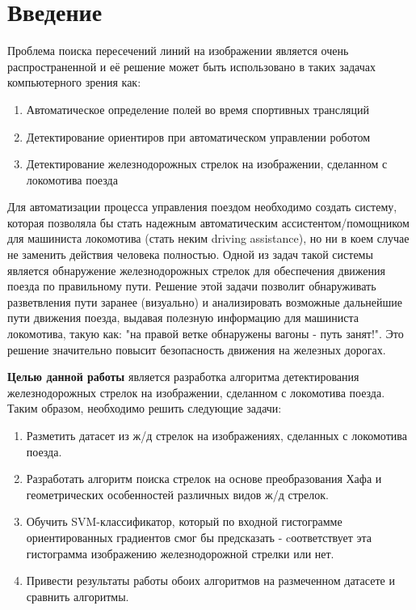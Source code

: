 \chapter{Введение}
\justify
Проблема поиска пересечений линий на изображении является очень распространенной и её решение может быть использовано в таких задачах компьютерного зрения как:
\begin{enumerate}
	\item Автоматическое определение полей во время спортивных трансляций
	\item Детектирование ориентиров при автоматическом управлении роботом
	\item Детектирование железнодорожных стрелок на изображении, сделанном с локомотива поезда
\end{enumerate} 

Для автоматизации процесса управления поездом необходимо создать систему, которая позволяла бы стать надежным автоматическим ассистентом/помощником для машиниста локомотива (стать неким driving assistance), но ни в коем случае не заменить действия человека полностью. 
Одной из задач такой системы является обнаружение железнодорожных стрелок для обеспечения движения поезда по правильному пути.
Решение этой задачи позволит обнаруживать разветвления пути заранее (визуально) и анализировать возможные дальнейшие пути движения поезда, выдавая полезную информацию для машиниста локомотива, такую как: "на правой ветке обнаружены вагоны - путь занят!". Это решение значительно повысит безопасность движения на железных дорогах.

\textbf{Целью данной работы} является разработка алгоритма детектирования железнодорожных стрелок на изображении, сделанном с локомотива поезда. Таким образом, необходимо решить следующие задачи:
\begin{enumerate}
	\item Разметить датасет из ж/д стрелок на изображениях, сделанных с локомотива поезда.
	\item Разработать алгоритм поиска стрелок на основе преобразования Хафа\cite{b:hough_transform} и геометрических особенностей различных видов ж/д стрелок.
	\item Обучить SVM\cite{b:SVM}-классификатор, который по входной гистограмме ориентированных градиентов\cite{b:HOG} смог бы предсказать - cоответствует эта гистограмма изображению железнодорожной стрелки или нет.
	\item Привести результаты работы обоих алгоритмов на размеченном датасете и сравнить алгоритмы.
\end{enumerate}


